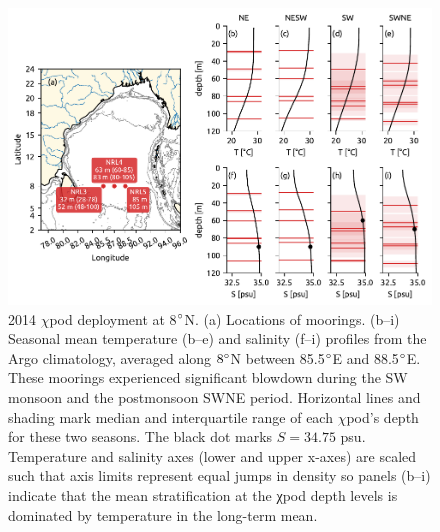 \documentclass[onecol]{ametsoc}
\begin{document}
\begin{figure}
\centering
\includegraphics[width=\textwidth]{figure3-map.pdf}
\caption{\label{fig:map}
2014 \(\chi\)pod deployment at 8\(\degree\)N. (a) Locations of moorings. (b--i) Seasonal mean temperature (b--e) and salinity (f--i) profiles from the Argo climatology, averaged along \(8\degree\)N between 85.5\(\degree\)E and 88.5\(\degree\)E. These moorings experienced significant blowdown during the SW monsoon and the postmonsoon SWNE period. Horizontal lines and shading mark median and interquartile range of each \(\chi\)pod's depth for these two seasons. The black dot marks \(S=34.75\) psu. Temperature and salinity axes (lower and upper x-axes) are scaled such that axis limits represent equal jumps in density so panels (b--i) indicate that the mean stratification at the χpod depth levels is dominated by temperature in the long-term mean.}
\end{figure}
\end{document}
